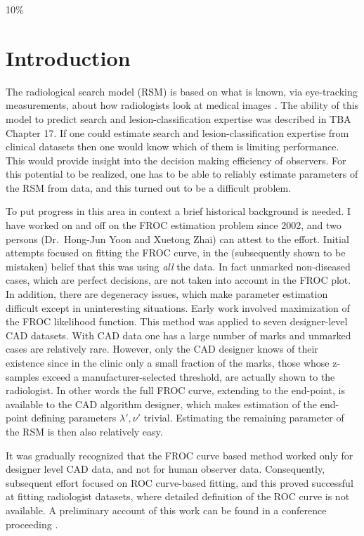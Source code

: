 \documentclass[
]{book}
\begin{document}
10\%

\hypertarget{rsm-fitting-intro}{%
\section{Introduction}\label{rsm-fitting-intro}}

The radiological search model (RSM) is based on what is known, via eye-tracking measurements, about how radiologists look at medical images \citep{kundel2004modeling}. The ability of this model to predict search and lesion-classification expertise was described in TBA Chapter 17. If one could estimate search and lesion-classification expertise from clinical datasets then one would know which of them is limiting performance. This would provide insight into the decision making efficiency of observers. For this potential to be realized, one has to be able to reliably estimate parameters of the RSM from data, and this turned out to be a difficult problem.

To put progress in this area in context a brief historical background is needed. I have worked on and off on the FROC estimation problem since 2002, and two persons (Dr.~Hong-Jun Yoon and Xuetong Zhai) can attest to the effort. Initial attempts focused on fitting the FROC curve, in the (subsequently shown to be mistaken) belief that this was using \emph{all} the data. In fact unmarked non-diseased cases, which are perfect decisions, are not taken into account in the FROC plot. In addition, there are degeneracy issues, which make parameter estimation difficult except in uninteresting situations. Early work involved maximization of the FROC likelihood function. This method was applied to seven designer-level CAD datasets. With CAD data one has a large number of marks and unmarked cases are relatively rare. However, only the CAD designer knows of their existence since in the clinic only a small fraction of the marks, those whose z-samples exceed a manufacturer-selected threshold, are actually shown to the radiologist. In other words the full FROC curve, extending to the end-point, is available to the CAD algorithm designer, which makes estimation of the end-point defining parameters \(\lambda', \nu'\) trivial. Estimating the remaining parameter of the RSM is then also relatively easy.

It was gradually recognized that the FROC curve based method worked only for designer level CAD data, and not for human observer data. Consequently, subsequent effort focused on ROC curve-based fitting, and this proved successful at fitting radiologist datasets, where detailed definition of the ROC curve is not available. A preliminary account of this work can be found in a conference proceeding \citep{RN2125}.
\end{document}

